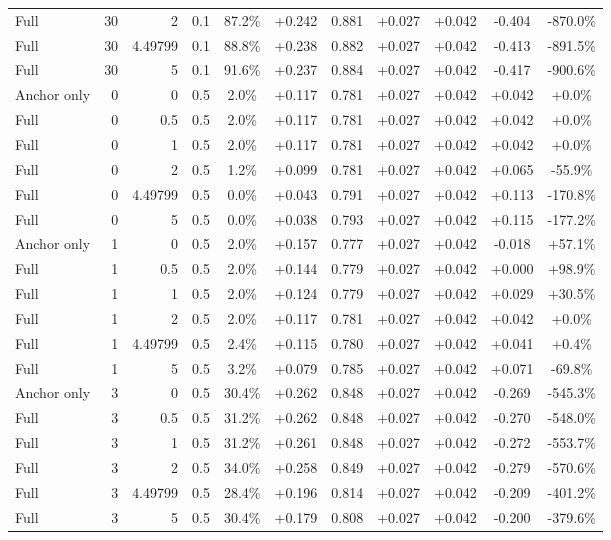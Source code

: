 \begin{table}[htbp]
\begin{tabular}{lrrrccccccc}
Full & 30 & 2 & 0.1 & 87.2\% & +0.242 & 0.881 & +0.027 & +0.042 & -0.404 & -870.0\% \\
Full & 30 & 4.49799 & 0.1 & 88.8\% & +0.238 & 0.882 & +0.027 & +0.042 & -0.413 & -891.5\% \\
Full & 30 & 5 & 0.1 & 91.6\% & +0.237 & 0.884 & +0.027 & +0.042 & -0.417 & -900.6\% \\
Anchor only & 0 & 0 & 0.5 & 2.0\% & +0.117 & 0.781 & +0.027 & +0.042 & +0.042 & +0.0\% \\
Full & 0 & 0.5 & 0.5 & 2.0\% & +0.117 & 0.781 & +0.027 & +0.042 & +0.042 & +0.0\% \\
Full & 0 & 1 & 0.5 & 2.0\% & +0.117 & 0.781 & +0.027 & +0.042 & +0.042 & +0.0\% \\
Full & 0 & 2 & 0.5 & 1.2\% & +0.099 & 0.781 & +0.027 & +0.042 & +0.065 & -55.9\% \\
Full & 0 & 4.49799 & 0.5 & 0.0\% & +0.043 & 0.791 & +0.027 & +0.042 & +0.113 & -170.8\% \\
Full & 0 & 5 & 0.5 & 0.0\% & +0.038 & 0.793 & +0.027 & +0.042 & +0.115 & -177.2\% \\
Anchor only & 1 & 0 & 0.5 & 2.0\% & +0.157 & 0.777 & +0.027 & +0.042 & -0.018 & +57.1\% \\
Full & 1 & 0.5 & 0.5 & 2.0\% & +0.144 & 0.779 & +0.027 & +0.042 & +0.000 & +98.9\% \\
Full & 1 & 1 & 0.5 & 2.0\% & +0.124 & 0.779 & +0.027 & +0.042 & +0.029 & +30.5\% \\
Full & 1 & 2 & 0.5 & 2.0\% & +0.117 & 0.781 & +0.027 & +0.042 & +0.042 & +0.0\% \\
Full & 1 & 4.49799 & 0.5 & 2.4\% & +0.115 & 0.780 & +0.027 & +0.042 & +0.041 & +0.4\% \\
Full & 1 & 5 & 0.5 & 3.2\% & +0.079 & 0.785 & +0.027 & +0.042 & +0.071 & -69.8\% \\
Anchor only & 3 & 0 & 0.5 & 30.4\% & +0.262 & 0.848 & +0.027 & +0.042 & -0.269 & -545.3\% \\
Full & 3 & 0.5 & 0.5 & 31.2\% & +0.262 & 0.848 & +0.027 & +0.042 & -0.270 & -548.0\% \\
Full & 3 & 1 & 0.5 & 31.2\% & +0.261 & 0.848 & +0.027 & +0.042 & -0.272 & -553.7\% \\
Full & 3 & 2 & 0.5 & 34.0\% & +0.258 & 0.849 & +0.027 & +0.042 & -0.279 & -570.6\% \\
Full & 3 & 4.49799 & 0.5 & 28.4\% & +0.196 & 0.814 & +0.027 & +0.042 & -0.209 & -401.2\% \\
Full & 3 & 5 & 0.5 & 30.4\% & +0.179 & 0.808 & +0.027 & +0.042 & -0.200 & -379.6\% \\

\end{tabular}
\end{table}
